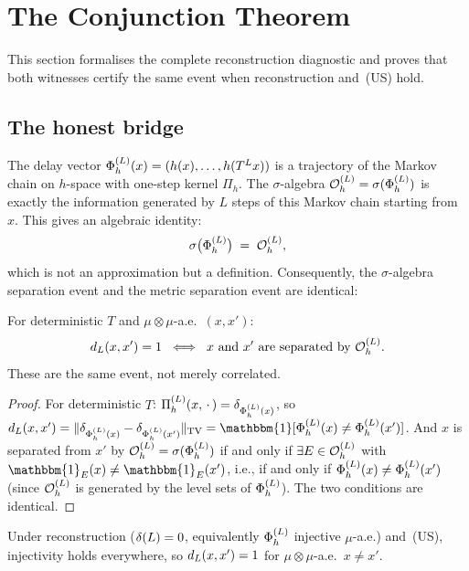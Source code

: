 \section{The Conjunction Theorem}
\label{III:sec:conjunction}

This section formalises the complete reconstruction diagnostic and proves
that both witnesses certify the same event when reconstruction and~(US) hold.

\subsection{The honest bridge}

The delay vector $\Phi_h^{(L)}(x) = (h(x), \ldots, h(T^L x))$ is a trajectory of the
Markov chain on $h$-space with one-step kernel $\Pi_h$.
The $\sigma$-algebra $\mathcal{O}_h^{(L)} = \sigma(\Phi_h^{(L)})$ is exactly the information
generated by $L$ steps of this Markov chain starting from $x$.
This gives an algebraic identity:
\[
  \sigma\bigl(\Phi_h^{(L)}\bigr) \;=\; \mathcal{O}_h^{(L)},
\]
which is not an approximation but a definition.
Consequently, the $\sigma$-algebra separation event and the metric separation event
are identical:

\begin{lemma}
\label{III:lem:alg-metric}
For deterministic $T$ and $\mu \otimes \mu$-a.e.\ $(x, x')$:
\[
  d_{L}(x,x') = 1
  \;\iff\;
  \text{$x$ and $x'$ are separated by $\mathcal{O}_h^{(L)}$.}
\]
These are the same event, not merely correlated.
\end{lemma}

\begin{proof}
For deterministic $T$:
$\Pi_h^{(L)}(x,\,\cdot\,) = \delta_{\Phi_h^{(L)}(x)}$, so
$\preddisc{L}(x,x') = \|\delta_{\PhiL(x)} - \delta_{\PhiL(x')}\|_{\mathrm{TV}}
= \mathbbm{1}[\PhiL(x) \neq \PhiL(x')]$.
And $x$ is separated from $x'$ by $\mathcal{O}_h^{(L)} = \sigma(\Phi_h^{(L)})$ if and only if
$\exists E \in \mathcal{O}_h^{(L)}$ with $\mathbbm{1}_E(x) \neq \mathbbm{1}_E(x')$, i.e.,
if and only if $\Phi_h^{(L)}(x) \neq \Phi_h^{(L)}(x')$ (since $\mathcal{O}_h^{(L)}$ is generated by the
level sets of $\Phi_h^{(L)}$).
The two conditions are identical.
\end{proof}

Under reconstruction ($\delta(L) = 0$, equivalently $\Phi_h^{(L)}$ injective $\mu$-a.e.)
and~(US), injectivity holds everywhere, so $d_{L}(x,x') = 1$ for
$\mu \otimes \mu$-a.e.\ $x \neq x'$.

